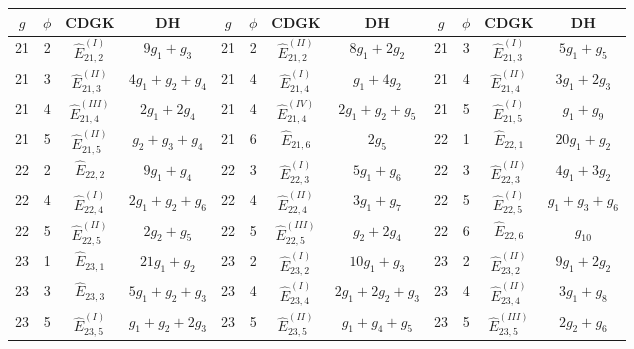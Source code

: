 \documentclass[a4paper,11pt]{article}
\begin{document}
\begin{table}
\begin{center}
{\scriptsize
\begin{tabular}{|cccc|cccc|cccc|}
\hline
$g$  &  $\phi$  &   CDGK   &   DH     &    $g$  &  $\phi$  &  CDGK  &  DH   &    $g$  &   $\phi$  &  CDGK  &  DH\\
\hline
21  &  2  &  $\widehat{E}_{21,2}^{(I)}$  &  $9g_{1}+g_{3}$    &    21  &  2  &  $\widehat{E}_{21,2}^{(II)}$  &  $8g_{1}+2g_{2}$    &    21  &  3  &  $\widehat{E}_{21,3}^{(I)}$  &  $5g_{1}+g_{5}$\\
21  &  3  &  $\widehat{E}_{21,3}^{(II)}$  &  $4g_{1}+g_{2}+g_{4}$    &    21  &  4  &  $\widehat{E}_{21,4}^{(I)}$  &  $g_{1}+4g_{2}$    &    21  &  4  &  $\widehat{E}_{21,4}^{(II)}$  &  $3g_{1}+2g_{3}$\\
21  &  4  &  $\widehat{E}_{21,4}^{(III)}$  &  $2g_{1}+2g_{4}$    &    21  &  4  &  $\widehat{E}_{21,4}^{(IV)}$  &  $2g_{1}+g_{2}+g_{5}$    &    21  &  5  &  $\widehat{E}_{21,5}^{(I)}$  &  $g_{1}+g_{9}$\\
21  &  5  &  $\widehat{E}_{21,5}^{(II)}$  &  $g_{2}+g_{3}+g_{4}$    &    21  &  6  &  $\widehat{E}_{21,6}$  &  $2g_{5}$    &    22  &  1  &  $\widehat{E}_{22,1}$  &  $20g_{1}+g_{2}$\\
22  &  2  &  $\widehat{E}_{22,2}$  &  $9g_{1}+g_{4}$    &    22  &  3  &  $\widehat{E}_{22,3}^{(I)}$  &  $5g_{1}+g_{6}$    &    22  &  3  &  $\widehat{E}_{22,3}^{(II)}$  &  $4g_{1}+3g_{2}$\\
22  &  4  &  $\widehat{E}_{22,4}^{(I)}$  &  $2g_{1}+g_{2}+g_{6}$    &    22  &  4  &  $\widehat{E}_{22,4}^{(II)}$  &  $3g_{1}+g_{7}$    &    22  &  5  &  $\widehat{E}_{22,5}^{(I)}$  &  $g_{1}+g_{3}+g_{6}$\\
22  &  5  &  $\widehat{E}_{22,5}^{(II)}$  &  $2g_{2}+g_{5}$    &    22  &  5  &  $\widehat{E}_{22,5}^{(III)}$  &  $g_{2}+2g_{4}$    &    22  &  6  &  $\widehat{E}_{22,6}$  &  $g_{10}$\\
23  &  1  &  $\widehat{E}_{23,1}$  &  $21g_{1}+g_{2}$    &    23  &  2  &  $\widehat{E}_{23,2}^{(I)}$  &  $10g_{1}+g_{3}$    &    23  &  2  &  $\widehat{E}_{23,2}^{(II)}$  &  $9g_{1}+2g_{2}$\\
23  &  3  &  $\widehat{E}_{23,3}$  &  $5g_{1}+g_{2}+g_{3}$    &    23  &  4  &  $\widehat{E}_{23,4}^{(I)}$  &  $2g_{1}+2g_{2}+g_{3}$    &    23  &  4  &  $\widehat{E}_{23,4}^{(II)}$  &  $3g_{1}+g_{8}$\\
23  &  5  &  $\widehat{E}_{23,5}^{(I)}$  &  $g_{1}+g_{2}+2g_{3}$    &    23  &  5  &  $\widehat{E}_{23,5}^{(II)}$  &  $g_{1}+g_{4}+g_{5}$    &    23  &  5  &  $\widehat{E}_{23,5}^{(III)}$  &  $2g_{2}+g_{6}$\\

\end{tabular}}
\end{center}
\end{table}
\end{document}
